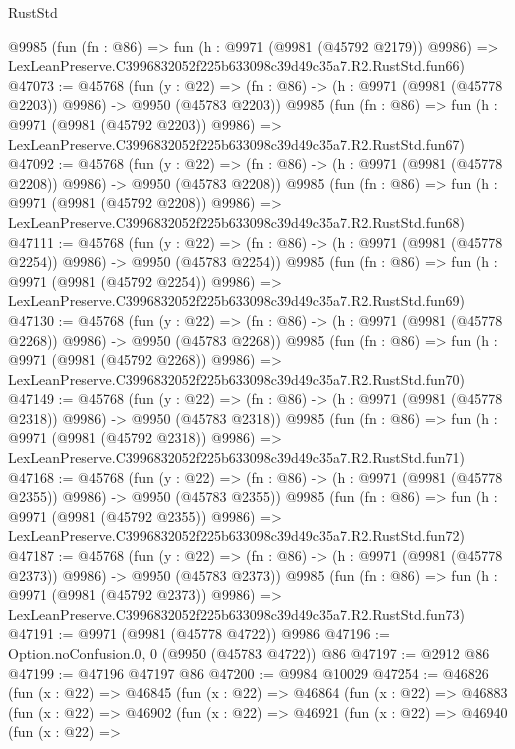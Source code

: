 \begin{lexlean}{RustStd}
\begin{coremodule}
    @9985
    (fun (fn : @86) =>
    fun (h : @9971 (@9981 (@45792 @2179)) @9986) =>
    LexLeanPreserve.C3996832052f225b633098c39d49c35a7.R2.RustStd.fun66)
@47073 := @45768
    (fun (y : @22) =>
    (fn : @86) -> (h : @9971 (@9981 (@45778 @2203)) @9986) -> @9950 (@45783 @2203))
    @9985
    (fun (fn : @86) =>
    fun (h : @9971 (@9981 (@45792 @2203)) @9986) =>
    LexLeanPreserve.C3996832052f225b633098c39d49c35a7.R2.RustStd.fun67)
@47092 := @45768
    (fun (y : @22) =>
    (fn : @86) -> (h : @9971 (@9981 (@45778 @2208)) @9986) -> @9950 (@45783 @2208))
    @9985
    (fun (fn : @86) =>
    fun (h : @9971 (@9981 (@45792 @2208)) @9986) =>
    LexLeanPreserve.C3996832052f225b633098c39d49c35a7.R2.RustStd.fun68)
@47111 := @45768
    (fun (y : @22) =>
    (fn : @86) -> (h : @9971 (@9981 (@45778 @2254)) @9986) -> @9950 (@45783 @2254))
    @9985
    (fun (fn : @86) =>
    fun (h : @9971 (@9981 (@45792 @2254)) @9986) =>
    LexLeanPreserve.C3996832052f225b633098c39d49c35a7.R2.RustStd.fun69)
@47130 := @45768
    (fun (y : @22) =>
    (fn : @86) -> (h : @9971 (@9981 (@45778 @2268)) @9986) -> @9950 (@45783 @2268))
    @9985
    (fun (fn : @86) =>
    fun (h : @9971 (@9981 (@45792 @2268)) @9986) =>
    LexLeanPreserve.C3996832052f225b633098c39d49c35a7.R2.RustStd.fun70)
@47149 := @45768
    (fun (y : @22) =>
    (fn : @86) -> (h : @9971 (@9981 (@45778 @2318)) @9986) -> @9950 (@45783 @2318))
    @9985
    (fun (fn : @86) =>
    fun (h : @9971 (@9981 (@45792 @2318)) @9986) =>
    LexLeanPreserve.C3996832052f225b633098c39d49c35a7.R2.RustStd.fun71)
@47168 := @45768
    (fun (y : @22) =>
    (fn : @86) -> (h : @9971 (@9981 (@45778 @2355)) @9986) -> @9950 (@45783 @2355))
    @9985
    (fun (fn : @86) =>
    fun (h : @9971 (@9981 (@45792 @2355)) @9986) =>
    LexLeanPreserve.C3996832052f225b633098c39d49c35a7.R2.RustStd.fun72)
@47187 := @45768
    (fun (y : @22) =>
    (fn : @86) -> (h : @9971 (@9981 (@45778 @2373)) @9986) -> @9950 (@45783 @2373))
    @9985
    (fun (fn : @86) =>
    fun (h : @9971 (@9981 (@45792 @2373)) @9986) =>
    LexLeanPreserve.C3996832052f225b633098c39d49c35a7.R2.RustStd.fun73)
@47191 := @9971 (@9981 (@45778 @4722)) @9986
@47196 := Option.noConfusion.{0, 0} (@9950 (@45783 @4722)) @86
@47197 := @2912 @86
@47199 := @47196 @47197 @86
@47200 := @9984 @10029
@47254 := @46826
    (fun (x : @22) =>
    @46845
      (fun (x : @22) =>
      @46864
        (fun (x : @22) =>
        @46883
          (fun (x : @22) =>
          @46902
            (fun (x : @22) =>
            @46921
              (fun (x : @22) =>
              @46940
                (fun (x : @22) =>

\end{coremodule}
\end{lexlean}

